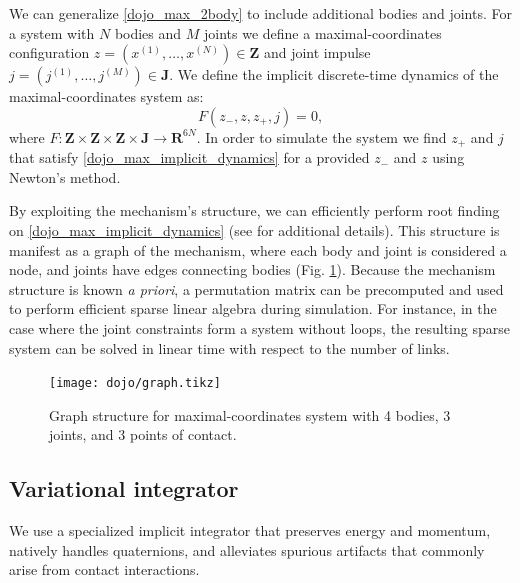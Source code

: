 We can generalize  \eqref{dojo_max_2body} to include additional bodies and joints. For a system with $N$ bodies and $M$ joints we define a maximal-coordinates configuration $z = (x^{(1)}, \dots, x^{(N)}) \in \mathbf{Z}$ and joint impulse $j = (j^{(1)}, \dots, j^{(M)}) \in \mathbf{J}$. We define the implicit discrete-time dynamics of the maximal-coordinates system as: 
\begin{equation} 
	F(z_{-}, z, z_{+}, j) = 0, \label{dojo_max_implicit_dynamics}
\end{equation}
where $F: \mathbf{Z} \times \mathbf{Z} \times \mathbf{Z} \times \mathbf{J} \rightarrow \mathbf{R}^{6N}$. In order to simulate the system we find $z_{+}$ and $j$ that satisfy \eqref{dojo_max_implicit_dynamics} for a provided $z_{-}$ and $z$ using Newton's method. 

By exploiting the mechanism's structure, we can efficiently perform root finding on \eqref{dojo_max_implicit_dynamics} (see \cite{brudigam2020linear} for additional details). This structure is manifest as a graph of the mechanism, where each body and joint is considered a node, and joints have edges connecting bodies (Fig. \ref{dojo_graph_structure}). Because the mechanism structure is known \textit{a priori}, a permutation matrix can be precomputed and used to perform efficient sparse linear algebra during simulation. For instance, in the case where the joint constraints form a system without loops, the resulting sparse system can be solved in linear time with respect to the number of links.

\begin{figure}[H]
	\centering
	\texttt{[image: dojo/graph.tikz]}
	\caption[Graph structure for maximal-coordinates state representation]{Graph structure for maximal-coordinates system with 4 bodies, 3 joints, and 3 points of contact.}
	\label{dojo_graph_structure}
\end{figure}

\subsection{Variational integrator}
We use a specialized implicit integrator that preserves energy and momentum, natively handles quaternions, and alleviates spurious artifacts that commonly arise from contact interactions. 

